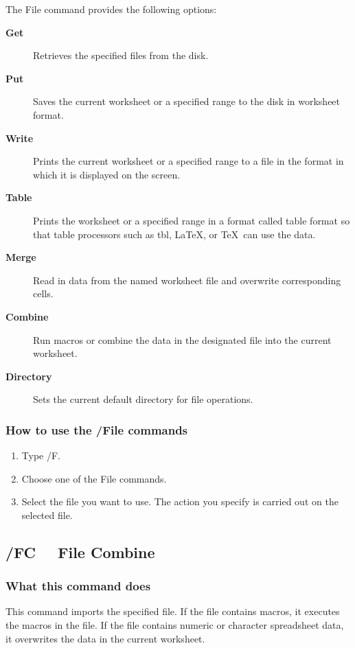 The File command provides the following options:
\begin{description}
\item[{\bf Get}]{Retrieves the specified files from the disk.}
\item[{\bf Put}]{Saves the current worksheet or a specified range to the disk
                in worksheet format.}
\item[{\bf Write}]{Prints the current worksheet or a specified range to a file in
                the format in which it is displayed on the screen.}
\item[{\bf Table}]{Prints the worksheet or a specified range in a format called
                table format so that table processors such as tbl, \LaTeX, or
                \TeX\  can use the data.}
\item[{\bf Merge}]{  Read in data from the named worksheet file and overwrite
                corresponding cells.}
\item[{\bf Combine}]{ Run macros or combine the data in the designated file into the
                current worksheet.}
\item[{\bf Directory}]{ Sets the current default directory for file
                operations.}
\end{description}

\subsubsection*{        How to use the /File commands}
\begin{enumerate}
\item{Type /F.}
\item{Choose one of the File commands.}
\item{Select the file you want to use.  The action you specify is
carried out on the selected file.}
\end{enumerate}
        
\subsection*{/FC \ \     File Combine}

\subsubsection*{What this command does}
This command imports the specified file.  If the file contains macros, 
it executes the macros in the file.  If the file contains numeric or 
character spreadsheet data, it overwrites the data in the current 
worksheet.

